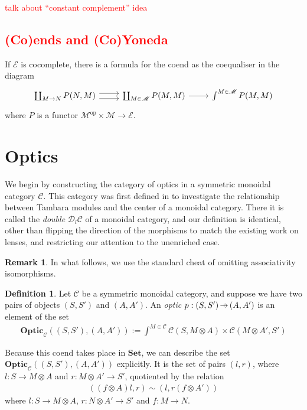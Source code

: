 \documentclass[11pt,a4paper]{article}
\theoremstyle{plain}
\theoremstyle{definition}
\newtheorem{definition}[theorem]{Definition}
\newtheorem{remark}[theorem]{Remark}
\newcommand{\C}{\mathscr{C}}
\newcommand{\E}{\mathscr{E}}
\newcommand{\M}{\mathscr{M}}
\newcommand{\Double}{\mathcal{D}}
\newcommand{\Set}{\mathbf{Set}}
\newcommand{\Optic}{\mathbf{Optic}}
\newcommand{\op}{\mathrm{op}}
\newcommand{\hto}{\ensuremath{\,\mathaccent\shortmid\rightarrow\,}}
\newcommand{\todo}[1]{\textcolor{red}{\small #1}}
\begin{document}
\todo{talk about ``constant complement'' idea}

\todo{
  \subsection{(Co)ends and (Co)Yoneda}
}
If $\E$ is cocomplete, there is a formula for the coend as the coequaliser in the diagram
\[
  \begin{tikzcd}
    \coprod_{M \to N} P(N, M) \ar[r,shift left=.75ex]  \ar[r,shift right=.75ex] & \coprod_{M \in \M} P(M, M) \ar[r] & \int^{M \in \M} P(M, M)
  \end{tikzcd}
\]
where $P$ is a functor $\M^\op \times \M \to \E$.

\section{Optics}
\label{sec-optics}

We begin by constructing the category of optics in a symmetric monoidal category $\C$. This category was first defined in \cite[Section 6]{Doubles} to investigate the relationship between Tambara modules and the center of a monoidal category. There it is called the \emph{double} $\Double_l \C$ of a monoidal category, and our definition is identical, other than flipping the direction of the morphisms to match the existing work on lenses, and restricting our attention to the unenriched case.

\begin{remark}
  In what follows, we use the standard cheat of omitting associativity isomorphisms.
\end{remark}

\begin{definition}
  Let $\C$ be a symmetric monoidal category, and suppose we have two pairs of objects $(S, S')$ and $(A, A')$. An \emph{optic} $p : (S, S') \hto (A, A')$ is an element of the set
  \begin{align*}
    \Optic_\C((S, S'), (A, A')) := \int^{M \in \C} \C(S, M \otimes A) \times \C(M \otimes A', S')
  \end{align*}
\end{definition}

Because this coend takes place in $\Set$, we can describe the set $\Optic_\C((S, S'), (A, A'))$ explicitly. It is the set of pairs $(l, r)$, where $l : S \to M \otimes A$ and $r : M \otimes A' \to S'$, quotiented by the relation
\begin{align*}
  ((f \otimes A) l, r) \sim (l, r (f \otimes A'))
\end{align*}
where $l : S \to M \otimes A$, $r : N \otimes A' \to S'$ and $f : M \to N$.
\end{document}
